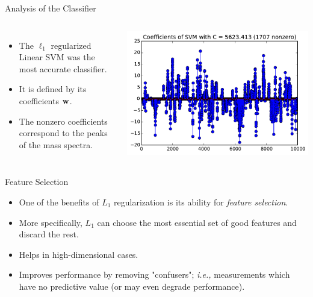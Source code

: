 \documentclass[10pt, aspectratio=169]{beamer} %
\newcommand{\w}{{\bf w}}
\begin{document}
\begin{frame}[fragile]{Analysis of the Classifier}
\begin{columns}
\begin{itemize}
\item The $\ell_1$ regularized Linear SVM was the
most accurate classifier.
\item It is defined by its coefficients $\w$.
\item The nonzero coefficients correspond to the
peaks of the mass spectra.
\end{itemize}
\includegraphics[width=1.1\columnwidth]{ovarian_coef.pdf}
\end{columns}
\end{frame}

\begin{frame}{Feature Selection}
\begin{itemize}
\item One of the benefits of $L_1$ regularization is its ability for \emph{feature selection}.
\item More specifically, $L_1$ can choose the most essential set of good features and discard the rest.
\item Helps in high-dimensional cases.
\item Improves performance by removing "confusers"; \emph{i.e.,} measurements which have no predictive value (or may even degrade performance).
\end{itemize}
\end{frame}
\end{document}
